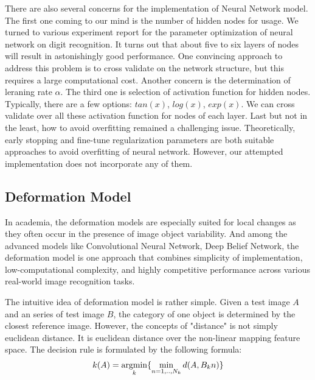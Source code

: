 \documentclass{article} %
\newcommand{\argmin}{\operatornamewithlimits{argmin}}
\begin{document}
There are also several concerns for the implementation of Neural Network model.
The first one coming to our mind is the number of hidden nodes for usage. We
turned to various experiment report for the parameter optimization of neural
network on digit recognition. It turns out that about five to six layers of
nodes will result in astonishingly good performance. One convincing approach
to address this problem is to cross validate on the network structure, but
this requires a large computational cost.
Another concern is the determination of leraning rate $\alpha$. The third one
is selection of activation function for hidden nodes. Typically, there are a
few options: $tan(x)$, $log(x)$, $exp(x)$. We can cross validate over all
these activation function for nodes of each layer. Last but not in the least,
 how to avoid overfitting remained a challenging issue. Theoretically, early
 stopping and fine-tune regularization parameters are both suitable approaches
 to avoid overfitting of neural network. However, our attempted implementation
 does not incorporate any of them. 

\subsection{Deformation Model}

In academia, the deformation models are especially suited for local changes as they often
occur in the presence of image object variability. And among the
advanced models like Convolutional Neural Network, Deep Belief Network, the
deformation model is one approach that combines simplicity of implementation,
low-computational complexity, and highly competitive performance across
various real-world image recognition tasks.


The intuitive idea of deformation model is rather simple.
Given a test image $A$ and an series of test image $B$, the category of
one object is determined by the closest reference image. However, the concepts
of "distance" is not simply euclidean distance. It is euclidean distance over
the non-linear mapping feature space. The decision rule is formulated by the
following formula:
\begin{align}
    k(A) = \argmin_{k} \{ \min_{n=1,..,N_k} d(A, B_kn) \}
\end{align}
\end{document}
